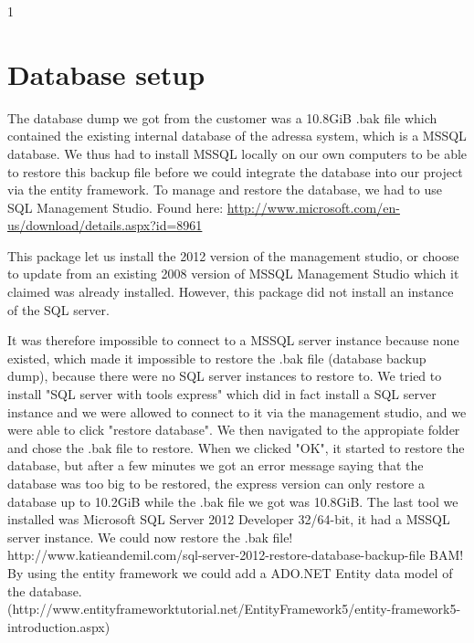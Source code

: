 1\section{Database setup}
The database dump we got from the customer was a 10.8GiB .bak file which contained the existing internal database of the adressa system, which is a MSSQL database.
We thus had to install MSSQL locally on our own computers to be able to restore this
 backup file before we could integrate the database into our project via the entity framework. To manage and restore the database, we had to use SQL Management Studio. Found here: \href{http://www.microsoft.com/en-us/download/details.aspx?id=8961}{http://www.microsoft.com/en-us/download/details.aspx?id=8961}

This package let us install the 2012 version of the management studio, or choose to update from an existing 2008 version of MSSQL Management Studio which it claimed was already installed. However, this package did not install an instance of the SQL server.

It was therefore impossible to connect to a MSSQL server instance because none existed, which made it impossible to restore the .bak file (database backup dump), because there were no SQL server instances to restore to.
We tried to install "SQL server with tools express" which did in fact install a SQL server instance and we were allowed to connect to it via the management studio, and we were able to click "restore database". We then navigated to the appropiate folder and chose the .bak file to restore. When we clicked "OK", it started to restore the database, but after a few minutes we got an error message saying that the database was too big to be restored, the express version can only restore a database up to 10.2GiB while the .bak file we got was 10.8GiB.
The last tool we installed was Microsoft SQL Server 2012 Developer 32/64-bit, it had a MSSQL server instance.
We could now restore the .bak file! http://www.katieandemil.com/sql-server-2012-restore-database-backup-file BAM!
By using the entity framework we could add a ADO.NET Entity data model of the database. (http://www.entityframeworktutorial.net/EntityFramework5/entity-framework5-introduction.aspx)